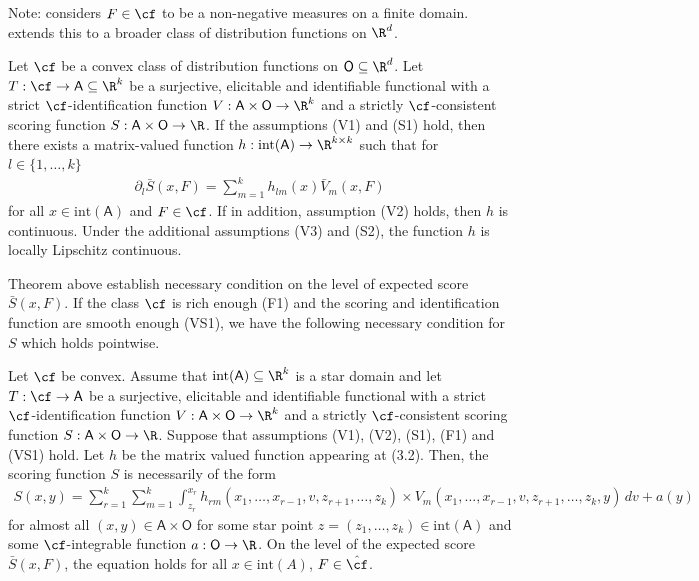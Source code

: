 
Note: \cite{osband1985} considers $F \in \cf$ to be a non-negative measures on a finite domain. \cite{fissler2016multiq} extends this to a broader class of distribution functions on $\R^d$.

\begin{theorem}
Let $\cf$ be a convex class of distribution functions on $\mathsf{O} \subseteq \R^d$. Let $T: \cf \to \mathsf{A} \subseteq \R^k$ be a surjective, elicitable and identifiable functional with a strict $\cf$-identification function $V: \mathsf{A} \times \mathsf{O} \to \R^k$ and a strictly $\cf$-consistent scoring function $S: \mathsf{A} \times \mathsf{O} \to \R$. If the assumptions (V1) and (S1) hold, then there exists a matrix-valued function $h: \mathrm{int}(\mathsf{A}) \to \R^{k \times k}$ such that for $l \in \{1, \ldots, k\}$
\begin{align}
\partial_l \bar{S}(x, F) = \sum_{m=1}^{k} h_{lm}(x) \bar{V}_m(x, F)
\end{align}
for all $x \in \mathrm{int}(\mathsf{A})$ and $F \in \cf$. If in addition, assumption (V2) holds, then $h$ is continuous. Under the additional assumptions (V3) and (S2), the function $h$ is locally Lipschitz continuous.
\end{theorem}

Theorem above establish necessary condition on the level of expected score $\bar{S}(x,F)$. If the class $\cf$ is rich enough (F1) and the scoring and identification function are smooth enough (VS1), we have the following necessary condition for $S$ which holds pointwise.

\begin{prop}
Let $\cf$ be convex. Assume that $\mathrm{int}(\mathsf{A}) \subseteq \R^k$ is a star domain and let $T: \cf \to \mathsf{A}$ be a surjective, elicitable and identifiable functional with a strict $\cf$-identification function $V: \mathsf{A} \times \mathsf{O} \to \R^k$ and a strictly $\cf$-consistent scoring function $S: \mathsf{A} \times \mathsf{O} \to \R$. Suppose that assumptions (V1), (V2), (S1), (F1) and (VS1) hold. Let $h$ be the matrix valued function appearing at (3.2). Then, the scoring function $S$ is necessarily of the form
\begin{align}
S(x, y) = \sum_{r=1}^{k} \sum_{m=1}^{k} \int_{z_r}^{x_r} h_{rm}(x_1, \ldots, x_{r-1}, v, z_{r+1}, \ldots, z_k) \times V_m(x_1, \ldots, x_{r-1}, v, z_{r+1}, \ldots, z_k, y) \, dv + a(y)
\end{align}
for almost all $(x, y) \in \mathsf{A} \times \mathsf{O}$ for some star point $z = (z_1, \ldots, z_k) \in \mathrm{int}(\mathsf{A})$ and some $\cf$-integrable function $a: \mathsf{O} \to \R$. On the level of the expected score $\bar{S}(x, F)$, the equation holds for all $x \in \mathrm{int}(A)$, $F \in \hat{\cf}$.
\end{prop}

